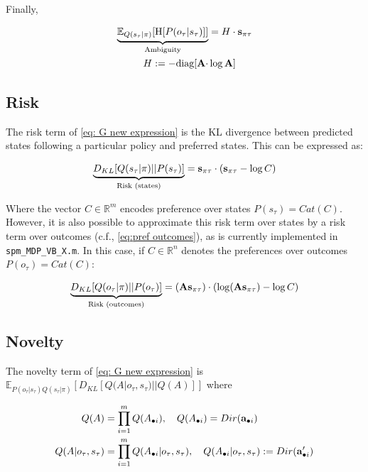 \documentclass[review,12pt,authoryear]{elsarticle}
\begin{document}
	Finally,
	
	\begin{equation}
	\begin{split}
	 		\underbrace{\mathbb E_{Q(s_\tau|\pi)} [\text{H}[P(o_\tau |s_\tau)]]}_{\text{Ambiguity}} &= H\cdot \bold s_{\pi \tau} \\
	 		H := - \text{diag} [\bold A \cdot & \log \bold A ]
	\end{split}
	\end{equation}

	
	\subsection{Risk}
	
	The risk term of \eqref{eq: G new expression} is the KL divergence between predicted states following a particular policy and preferred states. This can be expressed as:
	
	\begin{equation}
		\underbrace{D_{KL}[Q(s_\tau|\pi)||P(s_\tau)]}_{\text{Risk (states)}}= \bold s_{\pi\tau} \cdot (\bold s_{\pi\tau} - \log C)
	\end{equation}
	
	Where the vector $C \in \mathbb R^m$ encodes preference over states $P(s_\tau)=Cat(C)$. However, it is also possible to approximate this risk term over states by a risk term over outcomes (c.f., \eqref{eq:pref outcomes}), as is currently implemented in \texttt{spm\_MDP\_VB\_X.m}. In this case, if $C \in \mathbb R^n$ denotes the preferences over outcomes $P(o_\tau)=Cat(C)$:
	
	\begin{equation}
		\underbrace{D_{KL}[Q(o_\tau|\pi)||P(o_\tau)]}_{\text{Risk (outcomes)}} =(\bold A \bold s_{\pi\tau}) \cdot ( \log (\bold A \bold s_{\pi\tau}) - \log C)
	\end{equation}
	
	
	\subsection{Novelty}
	
The novelty term of \eqref{eq: G new expression} is ${\mathbb E_{P(o_\tau|s_\tau)Q(s_\tau|\pi)}[D_{KL}[Q(A|o_\tau,s_\tau)||Q(A)]]}$ where
	
	\begin{align}
		Q(A) &= \prod_{i=1}^m Q(A_{\bullet i}), \quad Q(A_{\bullet i}) = Dir(\bold a_{\bullet i}) \\
		Q(A|o_\tau, s_\tau) &= \prod_{i=1}^m Q(A_{\bullet i}|o_\tau, s_\tau), \quad Q(A_{\bullet i}|o_\tau, s_\tau) := Dir(\bold a'_{\bullet i}) 
	\end{align}
	
\end{document}
